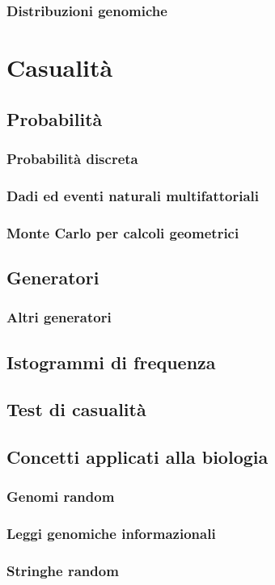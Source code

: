 \subsubsection{Distribuzioni genomiche}

\section{Casualità}

\subsection{Probabilità}

\subsubsection{Probabilità discreta}
\subsubsection{Dadi ed eventi naturali multifattoriali}

\subsubsection{Monte Carlo per calcoli geometrici}

\subsection{Generatori}

\subsubsection{Altri generatori}

\subsection{Istogrammi di frequenza}

\subsection{Test di casualità}

\subsection{Concetti applicati alla biologia}

\subsubsection{Genomi random}

\subsubsection{Leggi genomiche informazionali}

\subsubsection{Stringhe random}